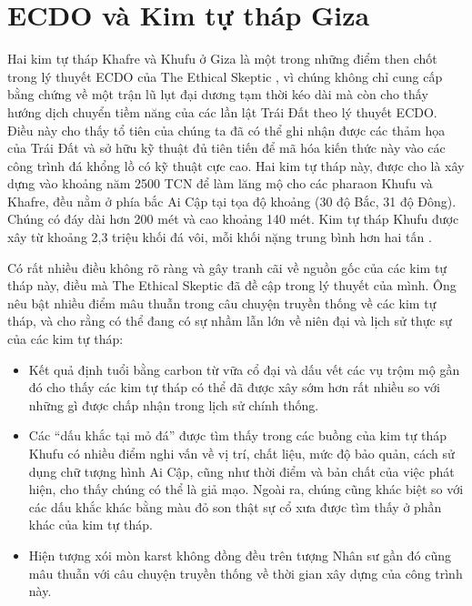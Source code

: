 \documentclass[10pt,twocolumn,letterpaper]{article}
\begin{document}
\section{ECDO và Kim tự tháp Giza}

Hai kim tự tháp Khafre và Khufu ở Giza là một trong những điểm then chốt trong lý thuyết ECDO của The Ethical Skeptic \cite{27}, vì chúng không chỉ cung cấp bằng chứng về một trận lũ lụt đại dương tạm thời kéo dài mà còn cho thấy hướng dịch chuyển tiềm năng của các lần lật Trái Đất theo lý thuyết ECDO. Điều này cho thấy tổ tiên của chúng ta đã có thể ghi nhận được các thảm họa của Trái Đất và sở hữu kỹ thuật đủ tiên tiến để mã hóa kiến thức này vào các công trình đá khổng lồ có kỹ thuật cực cao. Hai kim tự tháp này, được cho là xây dựng vào khoảng năm 2500 TCN để làm lăng mộ cho các pharaon Khufu và Khafre, đều nằm ở phía bắc Ai Cập tại tọa độ khoảng (30 độ Bắc, 31 độ Đông). Chúng có đáy dài hơn 200 mét và cao khoảng 140 mét. Kim tự tháp Khufu được xây từ khoảng 2,3 triệu khối đá vôi, mỗi khối nặng trung bình hơn hai tấn \cite{24, 25}.

Có rất nhiều điều không rõ ràng và gây tranh cãi về nguồn gốc của các kim tự tháp này, điều mà The Ethical Skeptic đã đề cập trong lý thuyết của mình. Ông nêu bật nhiều điểm mâu thuẫn trong câu chuyện truyền thống về các kim tự tháp, và cho rằng có thể đang có sự nhầm lẫn lớn về niên đại và lịch sử thực sự của các kim tự tháp:

\begin{flushleft}
\begin{itemize}
    \item Kết quả định tuổi bằng carbon từ vữa cổ đại và dấu vết các vụ trộm mộ gần đó cho thấy các kim tự tháp có thể đã được xây sớm hơn rất nhiều so với những gì được chấp nhận trong lịch sử chính thống.
    \item Các “dấu khắc tại mỏ đá” được tìm thấy trong các buồng của kim tự tháp Khufu có nhiều điểm nghi vấn về vị trí, chất liệu, mức độ bảo quản, cách sử dụng chữ tượng hình Ai Cập, cũng như thời điểm và bản chất của việc phát hiện, cho thấy chúng có thể là giả mạo. Ngoài ra, chúng cũng khác biệt so với các dấu khắc khác bằng màu đỏ son thật sự cổ xưa được tìm thấy ở phần khác của kim tự tháp.
    \item Hiện tượng xói mòn karst không đồng đều trên tượng Nhân sư gần đó cũng mâu thuẫn với câu chuyện truyền thống về thời gian xây dựng của công trình này.
\end{itemize}
\end{flushleft}
\end{document}
